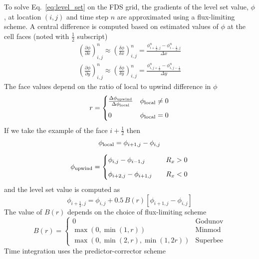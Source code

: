 To solve Eq.~\ref{eq:level_set} on the FDS grid, the gradients of the level set value, $\phi$, at location $(i,j)$ and time step $n$ are approximated using a flux-limiting scheme. A central difference is computed based on estimated values of $\phi$ at the cell faces (noted with $\frac{1}{2}$ subscript)
\begin{gather}
\left(\frac{\partial \phi}{\partial x}\right)_{i, j}^{n} \approx \left(\frac{\delta \phi}{\delta x}\right)_{i, j}^{n} =
\frac{\phi_{i+\frac{1}{2}, j}^{n}-\phi_{i-\frac{1}{2}, j}^{n}}{\Delta x} \\[8pt]
\left(\frac{\partial \phi}{\partial y}\right)_{i, j}^{n} \approx \left(\frac{\delta \phi}{\delta y}\right)_{i, j}^{n} =
\frac{\phi_{i, j+\frac{1}{2}}^{n}-\phi_{i, j-\frac{1}{2}}^{n}}{\Delta y}
\end{gather}
The face values depend on the ratio of local to upwind difference in $\phi$
\begin{equation}
r= \begin{cases}
    \frac{\Delta \phi_{\rm upwind}}{\Delta \phi_{\rm local}} & \phi_{\rm local} \neq 0 \\[6pt]
    0 & \phi_{\rm local} = 0
\end{cases}
\end{equation}
If we take the example of the face $i+\frac{1}{2}$ then
\begin{gather}
\phi_{\rm local} = \phi_{i+1, j}-\phi_{i, j} \\[6pt]
\phi_{\rm upwind}= \begin{cases}
    \phi_{i, j}-\phi_{i-1, j} &  \quad R_x > 0 \\[6pt]
    \phi_{i+2, j}-\phi_{i+1, j} & \quad R_x < 0
\end{cases}
\end{gather}
and the level set value is computed as
\begin{equation}
\phi_{i+\frac{1}{2},j} = \phi_{i,j} + 0.5 \, B(r) \left[\phi_{i+1,j}-\phi_{i,j} \right]
\end{equation}
The value of $B(r)$ depends on the choice of flux-limiting scheme
\begin{equation}
B(r)= \begin{cases}
    0 & \mathrm{Godunov} \\[4pt]
    \max(0, \min(1,r)) & \mathrm{Minmod} \\[4pt]
    \max(0, \min(2,r), \min(1,2r)) & \mathrm{Superbee}
\end{cases}
\end{equation}
Time integration uses the predictor-corrector scheme
